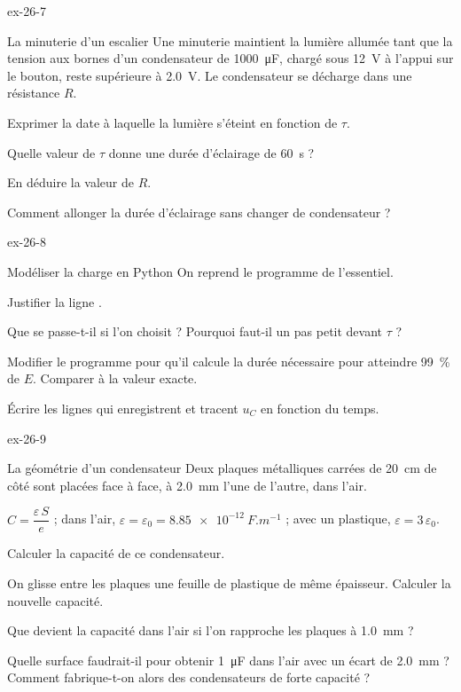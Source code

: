 \begin{blocLivre}{ex-26-7}
\begin{exercice}[2]{La minuterie d'un escalier}
Une minuterie maintient la lumière allumée tant que la tension aux bornes d'un condensateur de \qty{1000}{\micro F}, chargé sous
\qty{12}{V} à l'appui sur le bouton, reste supérieure à \qty{2,0}{V}. Le condensateur se décharge dans une résistance $R$.
\begin{questions}
\item Exprimer la date à laquelle la lumière s'éteint en fonction de $\tau$.
\item Quelle valeur de $\tau$ donne une durée d'éclairage de \qty{60}{s} ?
\item En déduire la valeur de $R$.
\item Comment allonger la durée d'éclairage sans changer de condensateur ?
\end{questions}
\end{exercice}
\end{blocLivre}
\begin{blocLivre}{ex-26-8}
\begin{exercice}[2]{Modéliser la charge en Python}
On reprend le programme de l'essentiel.
\begin{questions}
\item {}Justifier la ligne .
\item Que se passe-t-il si l'on choisit  ? Pourquoi faut-il un pas petit devant $\tau$ ?
\item Modifier le programme pour qu'il calcule la durée nécessaire pour atteindre 99~\% de $E$. Comparer à la valeur
exacte.
\item Écrire les lignes qui enregistrent et tracent $u_C$ en fonction du temps.
\end{questions}
\end{exercice}
\end{blocLivre}
\begin{blocLivre}{ex-26-9}
\begin{exercice}[2]{La géométrie d'un condensateur}
Deux plaques métalliques carrées de \qty{20}{cm} de côté sont placées face à face, à \qty{2,0}{mm} l'une de l'autre, dans l'air.
\begin{donnees}
$C=\dfrac{\varepsilon\,S}{e}$ ; dans l'air, $\varepsilon=\varepsilon_0=\qty{8,85e-12}{F.m^{-1}}$ ; avec un plastique, $\varepsilon=3\,\varepsilon_0$.
\end{donnees}
\begin{questions}
\item Calculer la capacité de ce condensateur.
\item On glisse entre les plaques une feuille de plastique de même épaisseur. Calculer la nouvelle capacité.
\item Que devient la capacité dans l'air si l'on rapproche les plaques à \qty{1,0}{mm} ?
\item Quelle surface faudrait-il pour obtenir \qty{1}{\micro F} dans l'air avec un écart de \qty{2,0}{mm} ? Comment fabrique-t-on
alors des condensateurs de forte capacité ?
\end{questions}
\end{exercice}
\end{blocLivre}
